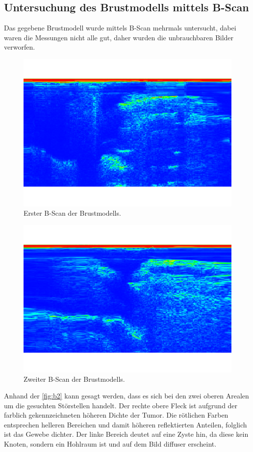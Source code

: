 \subsection{Untersuchung des Brustmodells mittels B-Scan}
\label{sec:Untersuchung des Brustmodells mittels B-Scan}

Das gegebene Brustmodell wurde mittels B-Scan mehrmals untersucht, dabei waren die Messungen nicht alle gut, daher wurden 
die unbrauchbaren Bilder verworfen.

\begin{figure}[H]
    \centering
	\includegraphics[width=0.8\linewidth]{content/grafik/Tumor_2.pdf}
    \captionsetup{width=0.765\linewidth}
	\caption{Erster B-Scan der Brustmodells.}
	\label{fig:b1}
\end{figure}

\begin{figure}[H]
    \centering
	\includegraphics[width=0.8\linewidth]{content/grafik/Super_Tumor.pdf}
    \captionsetup{width=0.765\linewidth}
	\caption{Zweiter B-Scan der Brustmodells.}
	\label{fig:b2}
\end{figure}

Anhand der \autoref{fig:b2} kann gesagt werden, dass es sich bei den zwei oberen Arealen um die gesuchten
Störstellen handelt. Der rechte obere Fleck ist aufgrund der farblich gekennzeichneten höheren Dichte der Tumor.
Die rötlichen Farben entsprechen helleren Bereichen und damit höheren reflektierten Anteilen, folglich ist das Gewebe dichter.
Der linke Bereich deutet auf eine Zyste hin, da diese kein Knoten, sondern ein Hohlraum ist und auf dem Bild diffuser erscheint.
